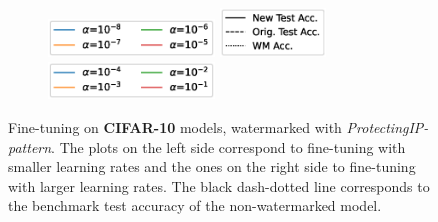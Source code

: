 \begin{figure}
     \begin{subfigure}[b]{\textwidth}
         \centering
         \includegraphics[height=1cm]{images/finetuning/legend_content_finetuning_smalllr_colors.eps}
         \quad
         \includegraphics[height=1.3cm]{images/finetuning/legend_content_finetuning_linetypes.eps}
         \quad
         \includegraphics[height=1cm]{images/finetuning/legend_content_finetuning_largelr_colors.eps}
     \end{subfigure}
     
     \caption{Fine-tuning on \textbf{CIFAR-10} models, watermarked with \textit{ProtectingIP-pattern}. The plots on the left side correspond to fine-tuning with smaller learning rates and the ones on the right side to fine-tuning with larger learning rates. The black dash-dotted line corresponds to the benchmark test accuracy of the non-watermarked model.}
     \label{fig:finetuning_cifar10models}
\end{figure}


